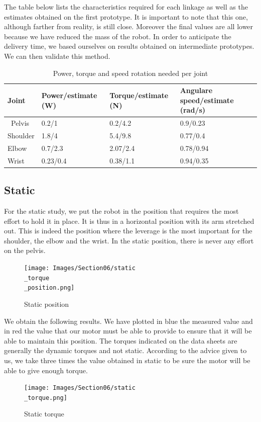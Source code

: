 \bigbreak
The table below lists the characteristics required for each linkage as well as the estimates obtained on the first prototype. It is important to note that this one, although farther from reality, is still close. Moreover the final values are all lower because we have reduced the mass of the robot. In order to anticipate the delivery time, we based ourselves on results obtained on intermediate prototypes. We can then validate this method. 

\begin{table}[ht]
    \centering
    \begin{tabular}{|p{1.5cm} | p{4cm} | p{4cm}|p{5cm} |} 
        \hline
        \textbf{Joint} & \textbf{Power/estimate (W)} & \textbf{Torque/estimate (N)}& \textbf{Angulare speed/estimate (rad/s)}\\ [0.3ex] 
        \hline\
        Pelvis & 0.2/1 & 0.2/4.2 & 0.9/0.23 \\ 
        \hline
        Shoulder & 1.8/4 & 5.4/9.8 & 0.77/0.4 \\ 
        \hline
        Elbow & 0.7/2.3 & 2.07/2.4 & 0.78/0.94 \\ 
        \hline
        Wrist & 0.23/0.4 & 0.38/1.1 & 0.94/0.35 \\ 
        \hline
    \end{tabular}
    \caption{Power, torque and speed rotation needed per joint}
\end{table}
\FloatBarrier

\subsection{Static}

For the static study, we put the robot in the position that requires the most effort to hold it in place. It is thus in a horizontal position with its arm stretched out. This is indeed the position where the leverage is the most important for the shoulder, the elbow and the wrist. In the static position, there is never any effort on the pelvis.
\begin{figure}[ht]
    \centering
    \texttt{[image: Images/Section06/static\\\_torque\\\_position.png]}
    \caption{Static position}
    \label{fig:StaticPosition}
\end{figure}
\FloatBarrier

\bigbreak
We obtain the following results. We have plotted in blue the measured value and in red the value that our motor must be able to provide to ensure that it will be able to maintain this position. The torques indicated on the data sheets are generally the dynamic torques and not static. According to the advice given to us, we take three times the value obtained in static to be sure the motor will be able to give enough torque.
\begin{figure}[ht]
    \centering
    \texttt{[image: Images/Section06/static\\\_torque.png]}
    \caption{Static torque}
    \label{fig:StaticTorque}
\end{figure}
\FloatBarrier

